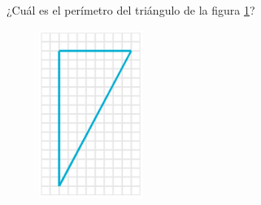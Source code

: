 
\question[25]  ¿Cuál es el perímetro del triángulo de la figura \ref{fig:peri_rect_03}?
\begin{figure}[H]
    \begin{center}
        \includegraphics[width=0.3\textwidth]{../images/peri_rect_03.png}
    \end{center}
    \caption{}
    \label{fig:peri_rect_03}
\end{figure}